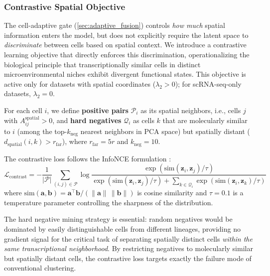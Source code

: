 \documentclass{article}
\begin{document}
\subsubsection{Contrastive Spatial Objective}
\label{sec:contrastive}

The cell-adaptive gate (\cref{sec:adaptive_fusion}) controls \textit{how much} spatial information enters the model, but does not explicitly require the latent space to \textit{discriminate} between cells based on spatial context. We introduce a contrastive learning objective that directly enforces this discrimination, operationalizing the biological principle that transcriptionally similar cells in distinct microenvironmental niches exhibit divergent functional states. This objective is active only for datasets with spatial coordinates ($\lambda_2 > 0$); for scRNA-seq-only datasets, $\lambda_2 = 0$.

For each cell $i$, we define \textbf{positive pairs} $\mathcal{P}_i$ as its spatial neighbors, i.e., cells $j$ with $A^{\text{spatial}}_{ij} > 0$, and \textbf{hard negatives} $\mathcal{Q}_i$ as cells $k$ that are molecularly similar to $i$ (among the top-$k_{\text{neg}}$ nearest neighbors in PCA space) but spatially distant ($d_{\text{spatial}}(i, k) > r_{\text{far}}$), where $r_{\text{far}} = 5r$ and $k_{\text{neg}} = 10$.

The contrastive loss follows the InfoNCE formulation \cite{oord2018representation}:
\begin{equation}
    \mathcal{L}_{\text{contrast}} = -\frac{1}{|\mathcal{P}|} \sum_{(i,j) \in \mathcal{P}} \log \frac{\exp\!\left(\text{sim}(\mathbf{z}_i, \mathbf{z}_j) / \tau\right)}{\exp\!\left(\text{sim}(\mathbf{z}_i, \mathbf{z}_j) / \tau\right) + \displaystyle\sum_{k \in \mathcal{Q}_i} \exp\!\left(\text{sim}(\mathbf{z}_i, \mathbf{z}_k) / \tau\right)}
    \label{eq:contrastive}
\end{equation}
where $\text{sim}(\mathbf{a}, \mathbf{b}) = \mathbf{a}^\top \mathbf{b} / (\|\mathbf{a}\| \, \|\mathbf{b}\|)$ is cosine similarity and $\tau = 0.1$ is a temperature parameter controlling the sharpness of the distribution.

The hard negative mining strategy is essential: random negatives would be dominated by easily distinguishable cells from different lineages, providing no gradient signal for the critical task of separating spatially distinct cells \textit{within the same transcriptional neighborhood}. By restricting negatives to molecularly similar but spatially distant cells, the contrastive loss targets exactly the failure mode of conventional clustering.
\end{document}
